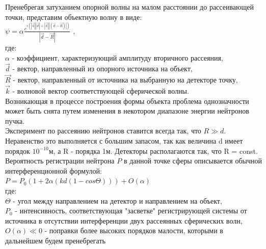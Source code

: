 \documentclass[11pt]{report}
\begin{document}
Пренебрегая затуханием опорной волны на малом расстоянии до рассеивающей точки, представим объектную волну в виде: \\

$\psi=\alpha\frac{e^{i(|\overrightarrow{k}| |\overrightarrow{d}| + |\overrightarrow{k}||(\overrightarrow{d}-\overrightarrow{R})| )}}{|\overrightarrow{d}-\overrightarrow{R}|}$ ,\\

где:\\

$\alpha$ - коэффициент, характеризующий амплитуду вторичного рассеяния, \\
$\overrightarrow{d}$ - вектор, направленный из опорного источника на объект, \\
$\overrightarrow{R}$ - вектор, направленный от источника на выбранную на детекторе точку, \\
$\overrightarrow{k}$ - волновой вектор соответствующей сферической волны. \\

Возникающая в процессе построения формы объекта проблема однозначности может быть снята путем изменения в некотором диапазоне энергии нейтронов пучка. \\

Эксперимент по рассеянию нейтронов ставится всегда так, что $R\gg d$. Неравенство это выполняется с большим запасом, так как величина d имеет порядок $10^{-10}$м, а R - порядка 1м. Детекторы располагаются так, что R = const. \\

Вероятность регистрации нейтрона $P$ в данной точке сферы описывается обычной интерференционной формулой: \\

$P=P_0(1+2\alpha(kd(1-cos\Theta ))) + O(\alpha)$ \\

где: \\

$\Theta $ - угол между направлением на детектор и направлением на объект, \\

$P_0$ - интенсивность, соответствующая "засветке" регистрирующей системы от источника в отсутствии интерференции двух рассеянных сферических волн, \\

$O(\alpha) \ll 0$ - поправки более высоких порядков малости, которыми в дальнейшем будем пренебрегать\\
\end{document}

